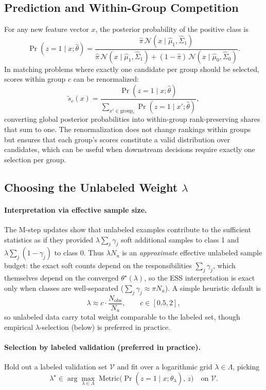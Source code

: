 \documentclass[11pt]{article}
\theoremstyle{definition}
\newcommand{\calN}{\mathcal{N}}
\newcommand{\lam}{\lambda}
\newcommand{\Sig}{\Sigma}
\begin{document}
\subsection{Prediction and Within-Group Competition}

For any new feature vector \(x\), the posterior probability of the
positive class is
\[
\Pr(z=1\mid x;\hat\theta)
= \frac{\hat\pi\,\calN(x\mid \hat\mu_1,\hat\Sig_1)}
{\hat\pi\,\calN(x\mid \hat\mu_1,\hat\Sig_1)
 + (1-\hat\pi)\,\calN(x\mid \hat\mu_0,\hat\Sig_0)}.
\]
In matching problems where exactly one candidate per group should be selected,
scores within group \(c\) can be renormalized:
\[
\tilde s_c(x) = \frac{\Pr(z=1\mid x;\hat\theta)}
{\sum_{x'\in\text{group}_c}\Pr(z=1\mid x';\hat\theta)},
\]
converting global posterior probabilities into within-group rank-preserving
shares that sum to one.
The renormalization does not change rankings within groups but
ensures that each group's scores constitute a valid distribution
over candidates, which can be useful when downstream decisions
require exactly one selection per group.

\subsection{Choosing the Unlabeled Weight \texorpdfstring{\(\lambda\)}{lambda}}

\paragraph{Interpretation via effective sample size.}
The M-step updates show that unlabeled examples contribute to the
sufficient statistics as if they provided
\(\lam\sum_j\gamma_j\) soft additional samples to class 1
and \(\lam\sum_j(1-\gamma_j)\) to class 0.
Thus \(\lam N_u\) is an \emph{approximate} effective unlabeled sample budget:
the exact soft counts depend on the responsibilities \(\sum_j\gamma_j\),
which themselves depend on the converged \(\theta^\star(\lam)\), so the
ESS interpretation is exact only when classes are well-separated
(\(\sum_j\gamma_j \approx \pi N_u\)).
A simple heuristic default is
\[
\lam \approx c\cdot\frac{N_{\mathrm{obs}}}{N_u},\qquad c\in[0.5,2],
\]
so unlabeled data carry total weight comparable to the labeled set,
though empirical \(\lam\)-selection (below) is preferred in practice.

\paragraph{Selection by labeled validation (preferred in practice).}
Hold out a labeled validation set \(\mathcal{V}\) and fit over a
logarithmic grid \(\lam\in\Lambda\), picking
\[
\lam^\star \in \arg\max_{\lam\in\Lambda}\;
\mathrm{Metric}\!\big(\Pr(z=1\mid x;\hat\theta_\lam),\,z\big)
\quad\text{on }\mathcal{V}.
\]
\end{document}
